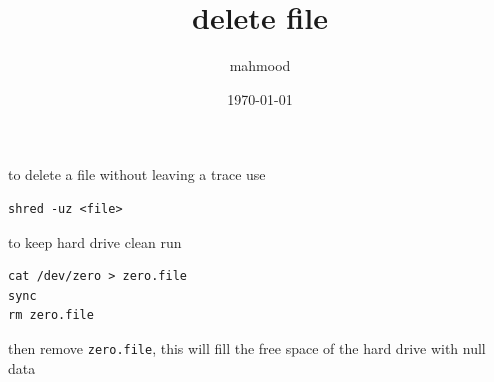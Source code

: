 \documentclass[a4paper,12pt]{article}
\author{mahmood}
\date{\today}
\title{delete file}
\begin{document}
\maketitle
to delete a file without leaving a trace use\\
\lstset{language=bash,label= ,caption= ,captionpos=b,numbers=none}
\begin{lstlisting}
shred -uz <file>
\end{lstlisting}
to keep hard drive clean run\\
\lstset{language=bash,label= ,caption= ,captionpos=b,numbers=none}
\begin{lstlisting}
cat /dev/zero > zero.file
sync
rm zero.file
\end{lstlisting}
then remove \texttt{zero.file}, this will fill the free space of the hard drive with null data
\end{document}

